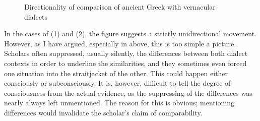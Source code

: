 \begin{figure}
\caption{Directionality of comparison of ancient Greek with vernacular dialects\label{tab:8.1}}
\end{figure}
In the cases of (1) and (2), the figure suggests a strictly unidirectional movement. However, as I have argued, especially in  above, this is too simple a picture. Scholars often suppressed, usually silently, the differences between both dialect contexts in order to underline the similarities, and they sometimes even forced one situation into the straitjacket of the other. This could happen either consciously or subconsciously. It is, however, difficult to tell the degree of consciousness from the actual evidence, as the suppressing of the differences was nearly always left unmentioned. The reason for this is obvious; mentioning differences would invalidate the scholar’s claim of comparability.


